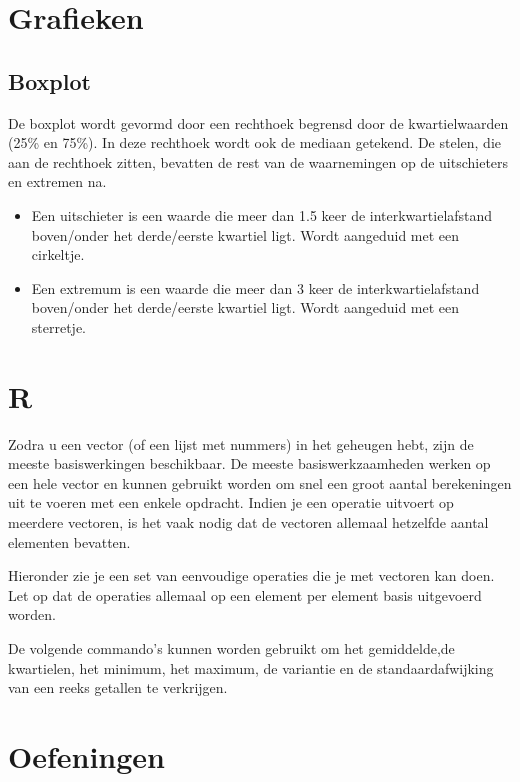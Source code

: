 \section{Grafieken}

\subsection{Boxplot}

De  boxplot wordt gevormd door een rechthoek begrensd door de kwartielwaarden (25\% en 75\%). In deze rechthoek wordt ook de mediaan getekend. De stelen, die aan de rechthoek zitten, bevatten de rest van de waarnemingen op de uitschieters en extremen na.

\begin{itemize}
  \item Een  uitschieter is een waarde die meer dan 1.5 keer de interkwartielafstand boven/onder het derde/eerste kwartiel ligt. Wordt aangeduid met een cirkeltje.
  \item Een  extremum is een waarde die meer dan 3 keer de interkwartielafstand boven/onder het derde/eerste kwartiel ligt. Wordt aangeduid met een sterretje.
\end{itemize}

\section{R}
Zodra u een vector (of een lijst met nummers) in het geheugen hebt, zijn de meeste basiswerkingen beschikbaar. De meeste basiswerkzaamheden werken op een hele vector en kunnen gebruikt worden om snel een groot aantal berekeningen uit te voeren met een enkele opdracht. Indien je een operatie uitvoert op meerdere vectoren, is het vaak nodig dat de vectoren allemaal hetzelfde aantal elementen bevatten.

Hieronder zie je een set van eenvoudige operaties die je met vectoren kan doen. Let op dat de operaties allemaal op een element per element basis uitgevoerd worden. 


De volgende commando's kunnen worden gebruikt om het gemiddelde,de kwartielen, het  minimum, het maximum, de variantie en  de standaardafwijking van een reeks getallen te verkrijgen.



\section{Oefeningen}

